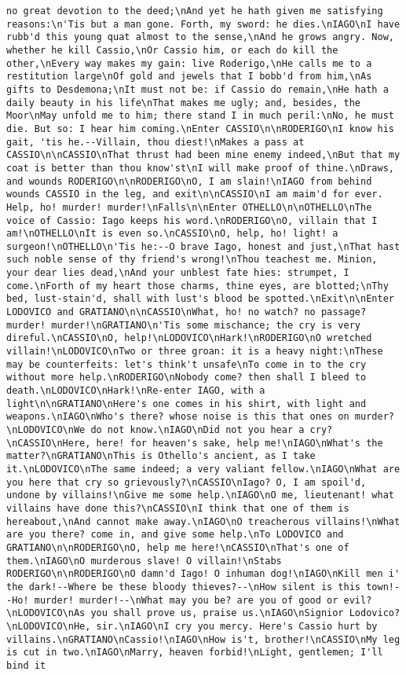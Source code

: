 \begin{verbatim}
no great devotion to the deed;\nAnd yet he hath given me satisfying reasons:\n'Tis but a man gone. Forth, my sword: he dies.\nIAGO\nI have rubb'd this young quat almost to the sense,\nAnd he grows angry. Now, whether he kill Cassio,\nOr Cassio him, or each do kill the other,\nEvery way makes my gain: live Roderigo,\nHe calls me to a restitution large\nOf gold and jewels that I bobb'd from him,\nAs gifts to Desdemona;\nIt must not be: if Cassio do remain,\nHe hath a daily beauty in his life\nThat makes me ugly; and, besides, the Moor\nMay unfold me to him; there stand I in much peril:\nNo, he must die. But so: I hear him coming.\nEnter CASSIO\n\nRODERIGO\nI know his gait, 'tis he.--Villain, thou diest!\nMakes a pass at CASSIO\n\nCASSIO\nThat thrust had been mine enemy indeed,\nBut that my coat is better than thou know'st\nI will make proof of thine.\nDraws, and wounds RODERIGO\n\nRODERIGO\nO, I am slain!\nIAGO from behind wounds CASSIO in the leg, and exit\n\nCASSIO\nI am maim'd for ever. Help, ho! murder! murder!\nFalls\n\nEnter OTHELLO\n\nOTHELLO\nThe voice of Cassio: Iago keeps his word.\nRODERIGO\nO, villain that I am!\nOTHELLO\nIt is even so.\nCASSIO\nO, help, ho! light! a surgeon!\nOTHELLO\n'Tis he:--O brave Iago, honest and just,\nThat hast such noble sense of thy friend's wrong!\nThou teachest me. Minion, your dear lies dead,\nAnd your unblest fate hies: strumpet, I come.\nForth of my heart those charms, thine eyes, are blotted;\nThy bed, lust-stain'd, shall with lust's blood be spotted.\nExit\n\nEnter LODOVICO and GRATIANO\n\nCASSIO\nWhat, ho! no watch? no passage? murder! murder!\nGRATIANO\n'Tis some mischance; the cry is very direful.\nCASSIO\nO, help!\nLODOVICO\nHark!\nRODERIGO\nO wretched villain!\nLODOVICO\nTwo or three groan: it is a heavy night:\nThese may be counterfeits: let's think't unsafe\nTo come in to the cry without more help.\nRODERIGO\nNobody come? then shall I bleed to death.\nLODOVICO\nHark!\nRe-enter IAGO, with a light\n\nGRATIANO\nHere's one comes in his shirt, with light and weapons.\nIAGO\nWho's there? whose noise is this that ones on murder?\nLODOVICO\nWe do not know.\nIAGO\nDid not you hear a cry?\nCASSIO\nHere, here! for heaven's sake, help me!\nIAGO\nWhat's the matter?\nGRATIANO\nThis is Othello's ancient, as I take it.\nLODOVICO\nThe same indeed; a very valiant fellow.\nIAGO\nWhat are you here that cry so grievously?\nCASSIO\nIago? O, I am spoil'd, undone by villains!\nGive me some help.\nIAGO\nO me, lieutenant! what villains have done this?\nCASSIO\nI think that one of them is hereabout,\nAnd cannot make away.\nIAGO\nO treacherous villains!\nWhat are you there? come in, and give some help.\nTo LODOVICO and GRATIANO\n\nRODERIGO\nO, help me here!\nCASSIO\nThat's one of them.\nIAGO\nO murderous slave! O villain!\nStabs RODERIGO\n\nRODERIGO\nO damn'd Iago! O inhuman dog!\nIAGO\nKill men i' the dark!--Where be these bloody thieves?--\nHow silent is this town!--Ho! murder! murder!--\nWhat may you be? are you of good or evil?\nLODOVICO\nAs you shall prove us, praise us.\nIAGO\nSignior Lodovico?\nLODOVICO\nHe, sir.\nIAGO\nI cry you mercy. Here's Cassio hurt by villains.\nGRATIANO\nCassio!\nIAGO\nHow is't, brother!\nCASSIO\nMy leg is cut in two.\nIAGO\nMarry, heaven forbid!\nLight, gentlemen; I'll bind it 
\end{verbatim}
